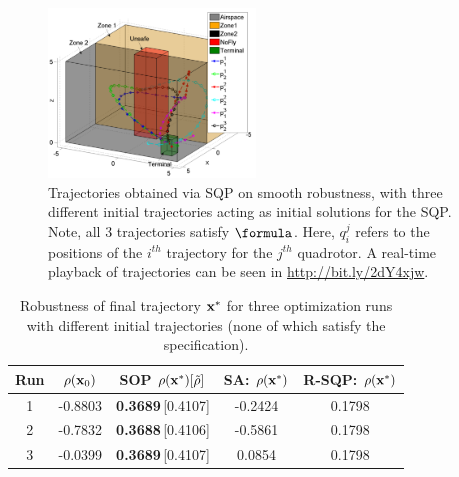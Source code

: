 

\begin{figure}[t]
\centering
\includegraphics[width=0.49\textwidth]{figures/QuadTrajs_u_scissored}
\vspace{-10pt}
\caption{{\small Trajectories obtained via SQP on smooth robustness, with three different initial trajectories acting as initial solutions for the SQP. Note, all 3 trajectories satisfy $\formula$. Here, $q_{i}^j$ refers to the positions of the $i^{th}$ trajectory for the $j^{th}$ quadrotor. 
A real-time playback of trajectories can be seen in \protect\url{http://bit.ly/2dY4xjw}.}}
\vspace{-10pt}
\label{fig:quad_ssqp}
\end{figure}


%
\begin{table}[htb]
\small
\begin{center}
\caption{{\small Robustness of final trajectory $\mathbf{x}^*$ for three optimization runs with different initial trajectories (none of which satisfy the specification).}}
\vspace{-10pt}
\label{tbl:opt_performance}
\begin{tabular} {|c|c|c|c|c|}
	\hline
	\textbf{Run} & $\rho(\mathbf{x}_0) $ &SOP $\rho(\mathbf{x}^*) [\tilde{\rho}]$ & SA: $\rho(\mathbf{x}^*)$ & R-SQP: $\rho(\mathbf{x}^*)$\\ \hline
	1 & -0.8803 & \textbf{0.3689}\,[0.4107] & -0.2424 & 0.1798 \\ \hline
	2 & -0.7832 & \textbf{0.3688}\,[0.4106] & -0.5861 & 0.1798 \\ \hline
	3 & -0.0399 & \textbf{0.3689}\,[0.4107] & 0.0854 & 0.1798 \\ \hline
\end{tabular}	
\end{center}
\vspace{-20pt}
\end{table}


